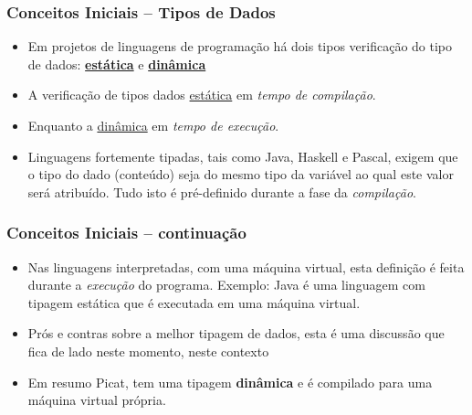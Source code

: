\begin{frame}[fragile]
 \frametitle{Conceitos Iniciais -- Tipos de Dados}


\begin{itemize}

\item Em projetos de linguagens de programação há dois tipos 
verificação do tipo de dados: \underline{\textbf{estática}} e 
 \underline{\textbf{dinâmica}}

  
  \pause 
  \item A verificação de tipos dados   \underline{estática} 
   em \textit{tempo de compilação}.
  
    \pause 
  \item Enquanto a \underline{dinâmica} em \textit{tempo de execução}.
  
  \pause 
  \item Linguagens fortemente tipadas, tais como Java, Haskell e Pascal, 
  exigem que o tipo do dado (conteúdo) seja do mesmo tipo da variável 
  ao qual este valor será atribuído. 
  Tudo isto é pré-definido durante a fase da \textit{compilação}.
  
\end{itemize}
\end{frame}


\begin{frame}[fragile]

 \frametitle{Conceitos Iniciais -- continuação}
\begin{itemize}

  \item Nas linguagens interpretadas, com uma máquina virtual, 
  esta definição é feita durante a \textit{execução} do
  programa. Exemplo: Java é uma linguagem com tipagem estática que 
  é executada em uma máquina virtual.

  
  \pause 
  \item Prós e contras sobre a melhor tipagem de dados, esta é
  uma discussão que fica de lado neste momento, neste contexto
  
  \pause 
  \item Em resumo Picat, tem uma tipagem \textbf{dinâmica} e
   é compilado para uma   máquina virtual própria.
  
\end{itemize}
\end{frame}



